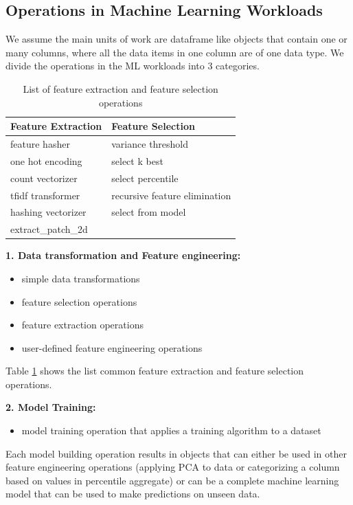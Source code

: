 \subsection{Operations in Machine Learning Workloads}
We assume the main units of work are dataframe like objects that contain one or many columns, where all the data items in one column are of one data type.
We divide the operations in the ML workloads into 3 categories.
\begin{table}
\centering
\begin{tabular}{ll}
\hline
	   Feature Extraction & Feature Selection\\ \hline
        feature hasher & variance threshold  \\
        one hot encoding & select k best \\
        count vectorizer& select percentile \\ 
        tfidf transformer & recursive feature elimination \\
        hashing vectorizer & select from model \\
        extract\_patch\_2d &  \\
        \hline
\end{tabular}
\caption{List of feature extraction and feature selection operations}\label{feature-engineering-operations}
\end{table}

\textbf{1. Data transformation and Feature engineering:}
\begin{itemize}
\item simple data transformations
\item feature selection operations
\item feature extraction operations
\item user-defined feature engineering operations
\end{itemize}
Table \ref{feature-engineering-operations} shows the list common feature extraction and feature selection operations.

\textbf{2. Model Training: }
\begin{itemize}
\item model training operation that applies a training algorithm to a dataset
\end{itemize}

Each model building operation results in objects that can either be used in other feature engineering operations (applying PCA to data or categorizing a column based on values in percentile aggregate) or can be a complete machine learning model that can be used to make predictions on unseen data.

